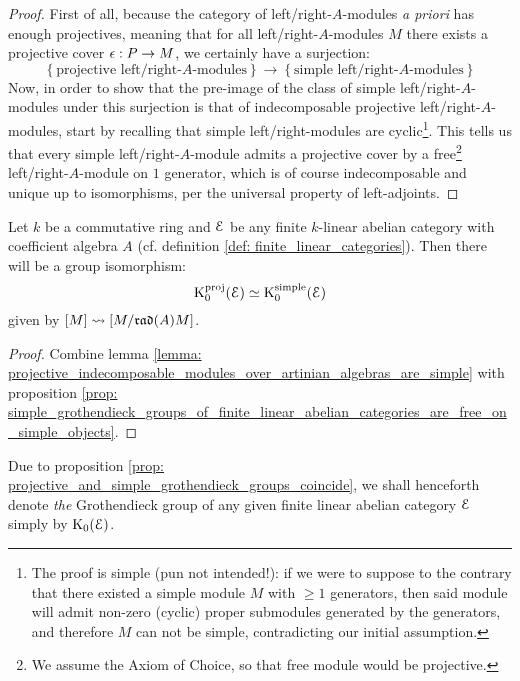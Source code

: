                 \begin{proof}
                    First of all, because the category of left/right-$A$-modules \textit{a priori} has enough projectives, meaning that for all left/right-$A$-modules $M$ there exists a projective cover $\epsilon: P \to M$, we certainly have a surjection:
                        $$
                            \left\{\text{projective left/right-$A$-modules}\right\}
                            \to
                            \left\{\text{simple left/right-$A$-modules}\right\}
                        $$
                    Now, in order to show that the pre-image of the class of simple left/right-$A$-modules under this surjection is that of indecomposable projective left/right-$A$-modules, start by recalling that simple left/right-modules are cyclic\footnote{The proof is simple (pun not intended!): if we were to suppose to the contrary that there existed a simple module $M$ with $\geq 1$ generators, then said module will admit non-zero (cyclic) proper submodules generated by the generators, and therefore $M$ can not be simple, contradicting our initial assumption.}. This tells us that every simple left/right-$A$-module admits a projective cover by a free\footnote{We assume the Axiom of Choice, so that free module would be projective.} left/right-$A$-module on $1$ generator, which is of course indecomposable and unique up to isomorphisms, per the universal property of left-adjoints.
                \end{proof}
            \begin{proposition} \label{prop: projective_and_simple_grothendieck_groups_coincide}
                Let $k$ be a commutative ring and $\mathcal{E}$ be any finite $k$-linear abelian category with coefficient algebra $A$ (cf. definition \ref{def: finite_linear_categories}). Then there will be a group isomorphism:
                    $$\mathrm{K}_0^{\mathrm{proj}}(\mathcal{E}) \simeq \mathrm{K}_0^{\mathrm{simple}}(\mathcal{E})$$
                given by $[M] \leadsto [M/\mathfrak{rad}(A) M]$.
            \end{proposition}
                \begin{proof}
                    Combine lemma \ref{lemma: projective_indecomposable_modules_over_artinian_algebras_are_simple} with proposition \ref{prop: simple_grothendieck_groups_of_finite_linear_abelian_categories_are_free_on_simple_objects}.
                \end{proof}
            \begin{convention}
                Due to proposition \ref{prop: projective_and_simple_grothendieck_groups_coincide}, we shall henceforth denote \textit{the} Grothendieck group of any given finite linear abelian category $\mathcal{E}$ simply by $\mathrm{K}_0(\mathcal{E})$.
            \end{convention}
            
